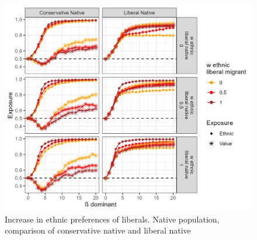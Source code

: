 \documentclass[
]{article}
\begin{document}
\begin{figure}[H]
    \centering
    \includegraphics{images/asym_native.jpg}
    \caption{Increase in ethnic preferences of liberals. Native population, comparison of conservative native and liberal native}
    \label{fig:asymnat}
\end{figure}
\end{document}
